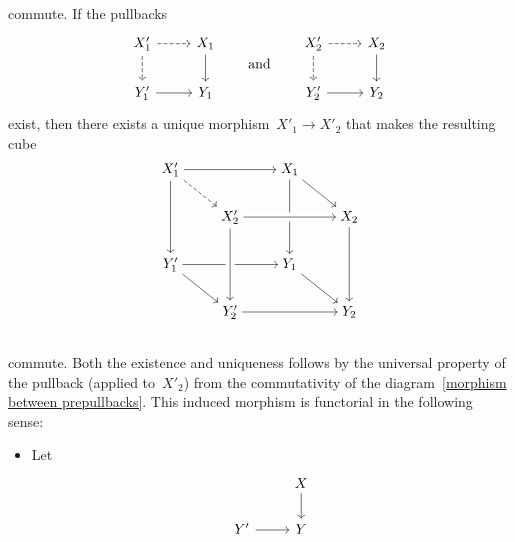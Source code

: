 \begin{remark*}
\begin{enumerate}
\begin{equation}
\begin{tikzcd}[cramped]
        \end{tikzcd}
      \end{equation}
      commute.
      If the pullbacks
      \[
        \begin{tikzcd}
            X'_1
            \arrow[dashed]{r}
            \arrow[dashed]{d}
          & X_1
            \arrow{d}
          \\
            Y'_1
            \arrow{r}
          & Y_1
        \end{tikzcd}
        \qquad\text{and}\qquad
        \begin{tikzcd}
            X'_2
            \arrow[dashed]{r}
            \arrow[dashed]{d}
          & X_2
            \arrow{d}
          \\
            Y'_2
            \arrow{r}
          & Y_2
        \end{tikzcd}
      \]
      exist, then there exists a unique morphism~$X'_1 \to X'_2$ that makes the resulting cube
      \[
        \begin{tikzcd}[cramped]
            X'_1
            \arrow{rr}
            \arrow[dashed]{dr}
            \arrow{dd}
          & {}
          & X_1
            \arrow{dd}
            \arrow{dr}
          & {}
          \\
            {}
          & X'_2
          & {}
          & X_2
            \arrow[from=ll, crossing over]
            \arrow{dd}
          \\
            Y'_1
            \arrow{rr}
            \arrow{dr}
          & {}
          & Y_1
            \arrow{dr}
          & {}
          \\
            {}
          & Y'_2
            \arrow[from=uu, crossing over]
            \arrow{rr}
          & {}
          & Y_2
          \\
        \end{tikzcd}
      \]
      commute.
      Both the existence and uniqueness follows by the universal property of the pullback (applied to~$X'_2$) from the commutativity of the diagram~\eqref{morphism between prepullbacks}.
      This induced morphism is functorial in the following sense:
      \begin{itemize}
        \item
          Let
          \[
            \begin{tikzcd}
                {}
              & X
                \arrow{d}
              \\
                Y'
                \arrow{r}
              & Y
            \end{tikzcd}
\]
\end{itemize}
\end{enumerate}
\end{remark*}
